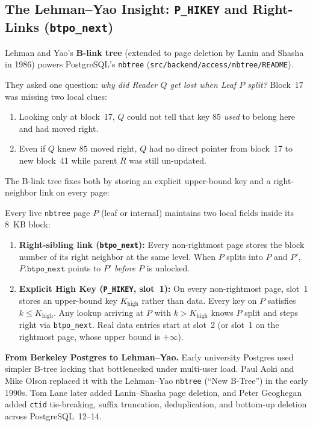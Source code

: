 \subsection{The Lehman--Yao Insight: \texttt{P\_HIKEY} and Right-Links (\texttt{btpo\_next})}

Lehman and Yao's \textbf{B-link tree} (extended to page deletion by Lanin and Shasha in 1986) powers PostgreSQL's \texttt{nbtree} (\texttt{src/backend/access/nbtree/README}).

They asked one question: \emph{why did Reader $Q$ get lost when Leaf $P$ split?} Block~17 was missing two local clues:
\begin{enumerate}
  \item Looking only at block~17, $Q$ could not tell that key $85$ \emph{used} to belong here and had moved right.
  \item Even if $Q$ knew $85$ moved right, $Q$ had no direct pointer from block~17 to new block~41 while parent $R$ was still un-updated.
\end{enumerate}

The B-link tree fixes both by storing an explicit upper-bound key and a right-neighbor link on every page:

\begin{definition}
\label{def:ch03-blink-invariants}
Every live \texttt{nbtree} page $P$ (leaf or internal) maintains two local fields inside its 8~KB block:
\begin{enumerate}
  \item \textbf{Right-sibling link (\texttt{btpo\_next}):} Every non-rightmost page stores the block number of its right neighbor at the same level. When $P$ splits into $P$ and $P'$, $P.\texttt{btpo\_next}$ points to $P'$ \emph{before} $P$ is unlocked.
  \item \textbf{Explicit High Key (\texttt{P\_HIKEY}, slot~1):} On every non-rightmost page, slot~1 stores an upper-bound key $K_{\text{high}}$ rather than data. Every key on $P$ satisfies $k \le K_{\text{high}}$. Any lookup arriving at $P$ with $k > K_{\text{high}}$ knows $P$ split and steps right via \texttt{btpo\_next}. Real data entries start at slot~2 (or slot~1 on the rightmost page, whose upper bound is $+\infty$).
\end{enumerate}
\end{definition}

\begin{historybox}
\textbf{From Berkeley Postgres to Lehman--Yao.} Early university Postgres used simpler B-tree locking that bottlenecked under multi-user load. Paul Aoki and Mike Olson replaced it with the Lehman--Yao \texttt{nbtree} (``New B-Tree'') in the early 1990s. Tom Lane later added Lanin--Shasha page deletion, and Peter Geoghegan added \texttt{ctid} tie-breaking, suffix truncation, deduplication, and bottom-up deletion across PostgreSQL~12--14.
\end{historybox}

